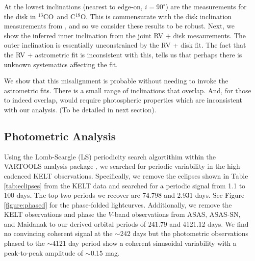 \documentclass[twocolumn]{aastex61}
\newcommand{\thirteen}{${}^{13}$CO}
\newcommand{\eighteen}{C${}^{18}$O}
\begin{document}
At the lowest inclinations (nearest to edge-on, $i = 90^\circ$) are the measurements for the disk in \thirteen\ and \eighteen. This is commensurate with the disk inclination measurements from \citet{fang17}, and so we consider these results to be robust. Next, we show the inferred inner inclination from the joint RV + disk mesaurements. The outer inclination is essentially unconstrained by the RV + disk fit. The fact that the RV + astrometric fit is inconsistent with this, tells us that perhaps there is unknown systematics affecting the fit.

We show that this misalignment is probable without needing to invoke the astrometric fits. There is a small range of inclinations that overlap. And, for those to indeed overlap, would require photospheric properties which are inconsistent with our analysis. (To be detailed in next section).



\subsection{Photometric Analysis}
Using the Lomb-Scargle (LS) periodicity search algortithim \citep{Lomb76,Scargle82} within the VARTOOLS analysis package \citep{Hartman:12}, we searched for periodic variability in the high cadenced KELT observations. Specifically, we remove the eclipses shown in Table \ref{tab:eclipses} from the KELT data and searched for a periodic signal from 1.1 to 100 days. The top two periods we recover are 74.798 and 2.931 days. See Figure \ref{figure:phased} for the phase-folded lightcurves. Additionally, we remove the KELT observations and phase the $V$-band observations from ASAS, ASAS-SN, and Maidanak to our derived orbital periods of 241.79 and 4121.12 days. We find no convincing coherent signal at the $\sim$242 days but the photometric observations phased to the $\sim$4121 day period show a coherent sinusoidal variability with a peak-to-peak amplitude of $\sim$0.15 mag.
\end{document}

